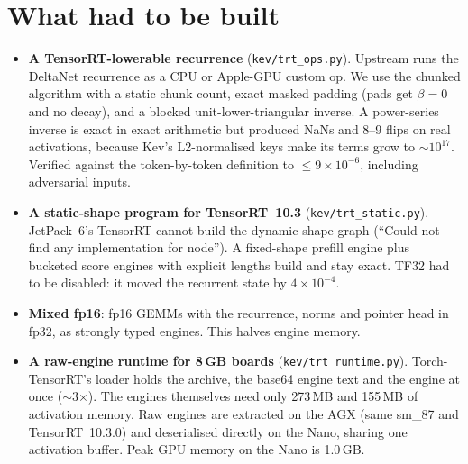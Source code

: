 \documentclass[10pt]{article}
\begin{document}
\section{What had to be built}
\begin{itemize}
\item \textbf{A TensorRT-lowerable recurrence} (\texttt{kev/trt\_ops.py}). Upstream runs the DeltaNet recurrence as a CPU or Apple-GPU custom op. We use the chunked algorithm with a static chunk count, exact masked padding (pads get $\beta{=}0$ and no decay), and a blocked unit-lower-triangular inverse. A power-series inverse is exact in exact arithmetic but produced NaNs and 8--9 flips on real activations, because Kev's L2-normalised keys make its terms grow to $\sim10^{17}$. Verified against the token-by-token definition to $\le 9\times10^{-6}$, including adversarial inputs.
\item \textbf{A static-shape program for TensorRT~10.3} (\texttt{kev/trt\_static.py}). JetPack~6's TensorRT cannot build the dynamic-shape graph (``Could not find any implementation for node''). A fixed-shape prefill engine plus bucketed score engines with explicit lengths build and stay exact. TF32 had to be disabled: it moved the recurrent state by $4\times10^{-4}$.
\item \textbf{Mixed fp16}: fp16 GEMMs with the recurrence, norms and pointer head in fp32, as strongly typed engines. This halves engine memory.
\item \textbf{A raw-engine runtime for 8\,GB boards} (\texttt{kev/trt\_runtime.py}). Torch-TensorRT's loader holds the archive, the base64 engine text and the engine at once ($\sim$3$\times$). The engines themselves need only 273\,MB and 155\,MB of activation memory. Raw engines are extracted on the AGX (same sm\_87 and TensorRT~10.3.0) and deserialised directly on the Nano, sharing one activation buffer. Peak GPU memory on the Nano is 1.0\,GB.
\end{itemize}
\end{document}
